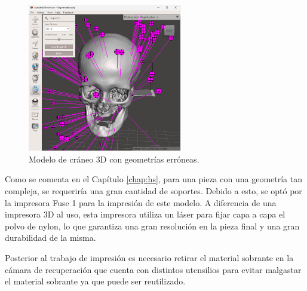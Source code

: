 \begin{figure}
  \centering
  \includegraphics[width=0.6\textwidth]{imaxes/arreglo_geo.png}
  \caption{Modelo de cráneo 3D con geometrías erróneas.}
  \label{fig:arr_geo}
\end{figure}

 Como se comenta en el Capítulo \ref{chap:hs}, para una pieza con una geometría tan compleja, se requeriría una gran cantidad de soportes. Debido a esto, se optó por la impresora Fuse 1 para la impresión de este modelo. A diferencia de una impresora 3D al uso, esta impresora utiliza un láser para fijar capa a capa el polvo de nylon, lo que garantiza una gran resolución en la pieza final y una gran durabilidad de la misma. 

 Posterior al  trabajo de impresión es necesario retirar el material sobrante en la cámara de recuperación que cuenta con distintos utensilios para evitar malgastar el material sobrante ya que puede ser reutilizado.

